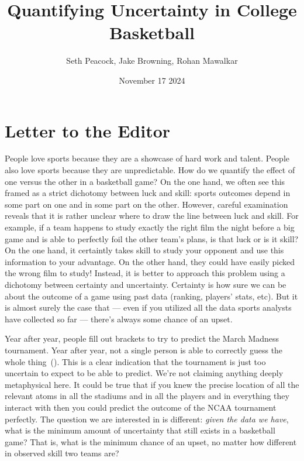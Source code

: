 \documentclass{article}
\title{Quantifying Uncertainty in College Basketball}
\author{Seth Peacock, Jake Browning, Rohan Mawalkar}
\date{November 17 2024}
\begin{document}
\maketitle

\newpage

\section{Letter to the Editor}

People love sports because they are a showcase of hard work and talent. People also love sports because they are unpredictable. How do we quantify the effect of one versus the other in a basketball game? On the one hand, we often see this framed as a strict dichotomy between luck and skill: sports outcomes depend in some part on one and in some part on the other. However, careful examination reveals that it is rather unclear where to draw the line between luck and skill. For example, if a team happens to study exactly the right film the night before a big game and is able to perfectly foil the other team's plans, is that luck or is it skill? On the one hand, it certaintly takes skill to study your opponent and use this information to your advantage. On the other hand, they could have easily picked the wrong film to study! Instead, it is better to approach this problem using a dichotomy between certainty and uncertainty. Certainty is how sure we can be about the outcome of a game using past data (ranking, players' stats, etc). But it is almost surely the case that --- even if you utilized all the data sports analysts have collected so far --- there's always some chance of an upset.

Year after year, people fill out brackets to try to predict the March Madness tournament. Year after year, not a single person is able to correctly guess the whole thing~(\cite{cbsnewsAnyoneEver}). This is a clear indication that the tournament is just too uncertain to expect to be able to predict. We're not claiming anything deeply metaphysical here. It could be true that if you knew the precise location of all the relevant atoms in all the stadiums and in all the players and in everything they interact with then you could predict the outcome of the NCAA tournament perfectly. The question we are interested in is different: \textit{given the data we have}, what is the minimum amount of uncertainty that still exists in a basketball game? That is, what is the minimum chance of an upset, no matter how different in observed skill two teams are?
\end{document}
